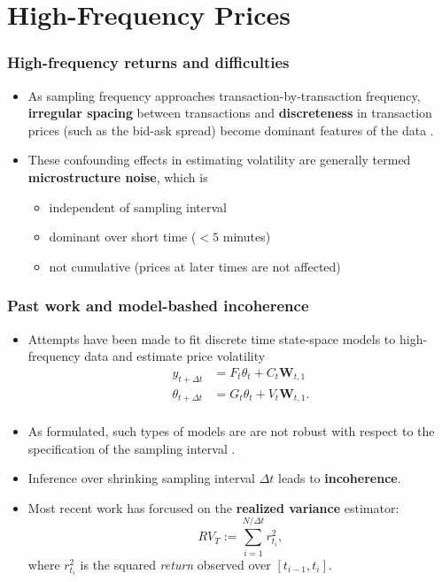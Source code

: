 \documentclass{beamer}
\begin{document}
\section{High-Frequency Prices}
\begin{frame}
  \frametitle{High-frequency returns and difficulties}
  \begin{itemize}
  \item As sampling frequency approaches transaction-by-transaction
    frequency, \textbf{irregular spacing} between transactions and 
    \textbf{discreteness} in transaction prices (such as the bid-ask
    spread) become dominant features of the data
    \citep{stoll2000presidential}.

  \item These confounding effects in estimating volatility are
    generally termed \textbf{microstructure noise}, which is

    \begin{itemize}
    \item independent of sampling interval
    \item dominant over short time ($<5$ minutes)
    \item not cumulative (prices at later times are not affected)
    \end{itemize}

  \end{itemize}
\end{frame}
\begin{frame}
  \frametitle{Past work and model-bashed incoherence}
  \begin{itemize}
  \item Attempts have been made to fit discrete time state-space
    models to high-frequency data and estimate price volatility
    \citep{bollerslev1986,andersen1997intraday}
    \begin{align*}
      y_{t+\Delta t} &= F_{t} \theta_t + C_t \mathbf{W}_{t,1} \\
      \theta_{t+\Delta t} &= G_{t} \theta_t + V_t \mathbf{W}_{t,1}. \\
    \end{align*}

  \item As formulated, such types of models are are not
    robust with respect to the specification of the sampling interval
    \citep{drost1993aggregation, andersen1997intraday,
      zumbach2000pitfalls}.

  \item Inference over shrinking sampling interval $\Delta t$ leads to
    \textbf{incoherence}.

  \item Most recent work has forcused on the \textbf{realized variance} estimator:
    \[
      RV_T := \sum_{i=1}^{N/\Delta t} r_{t_i}^2,
    \]
    where $r_{t_i}^2$ is the squared \textit{return} observed over $[t_{i-1}, t_i]$.
  \end{itemize}
\end{frame}
\end{document}
